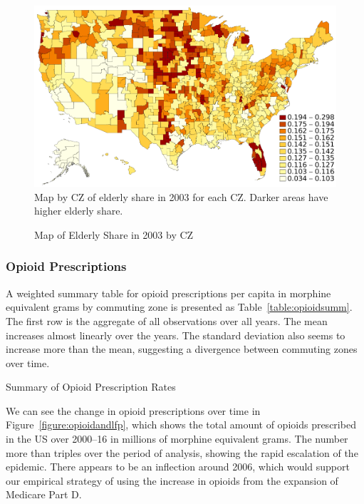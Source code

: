 \documentclass[12pt]{article}
\begin{document}
\begin{figure}[htbp]
    \centering
    \caption{Map of Elderly Share in 2003 by CZ}
    \begin{minipage}{\textwidth}
    \includegraphics[width=\textwidth]{figs/map_shold.pdf}
    \footnotesize
    Map by CZ of elderly share in 2003 for each CZ\@.  Darker areas have higher elderly share.
    \end{minipage}
    \label{figure:sholdmap}
\end{figure}

\subsubsection{Opioid Prescriptions}
A weighted summary table for opioid prescriptions per capita in morphine equivalent grams by commuting zone is presented as Table~\ref{table:opioidsumm}.  The first row is the aggregate of all observations over all years.  The mean increases almost linearly over the years.  The standard deviation also seems to increase more than the mean, suggesting a divergence between commuting zones over time.

\begin{table}
    \footnotesize
    \centering
    \caption{Summary of Opioid Prescription Rates}
    
    \label{table:opioidsumm}
\end{table}

We can see the change in opioid prescriptions over time in Figure~\ref{figure:opioidandlfp}, which shows the total amount of opioids prescribed in the US over 2000--16 in millions of morphine equivalent grams.  The number more than triples over the period of analysis, showing the rapid escalation of the epidemic.  There appears to be an inflection around 2006, which would support our empirical strategy of using the increase in opioids from the expansion of Medicare Part D.
\end{document}
